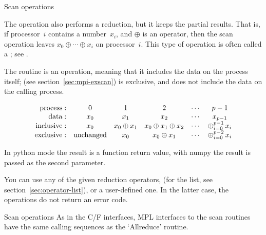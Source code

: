 
 {Scan operations}
\label{sec:scan}

The  operation also performs a reduction, but it keeps 
the partial results. That is, if processor~$i$ contains a number~$x_i$, 
and $\oplus$ is an operator,
then the scan operation leaves $x_0\oplus\cdots\oplus x_i$ on processor~$i$.
This type of operation is often called a ;
see .

The  routine is an  operation,
meaning that it includes the data on the process itself;
 (see section~\ref{sec:mpi-exscan})
is exclusive, and does not include the data on the calling process.

\[
\begin{array}{rccccc}
  \mathrm{process:}
      &0&1&2&\cdots&p-1\\
  \mathrm{data:}
      &x_0&x_1&x_2&\cdots&x_{p-1}\\
  \mathrm{inclusive:}\mathstrut
      &x_0&x_0\oplus x_1&x_0\oplus x_1\oplus x_2&\cdots&\mathop\oplus_{i=0}^{p-1} x_i\\
  \mathrm{exclusive:}\mathstrut
      &\mathrm{unchanged}&x_0&x_0\oplus x_1&\cdots&\mathop\oplus_{i=0}^{p-2} x_i\\
\end{array}
\]


In python mode the result is a function return value,
with numpy the result is passed as the second parameter.
%

You can use any of the given reduction operators,
  (for the list, see section~\ref{sec:operator-list}),
or a user-defined one. In the latter case,
the  operations do not return an error code.

\begin{mplnote}{Scan operations}
  As in the C/F interfaces, \ac{MPL} interfaces to the scan routines
  have the same calling sequences as the `Allreduce' routine.
\end{mplnote}

